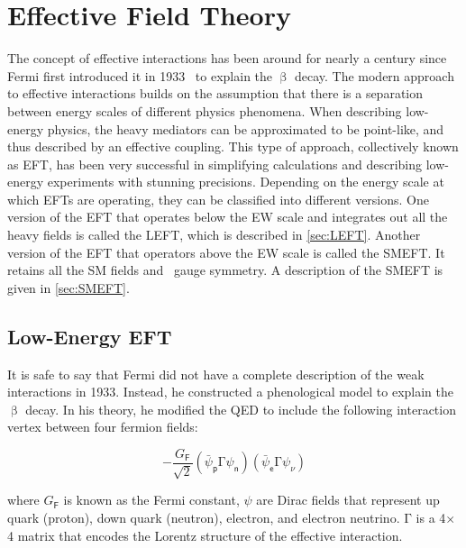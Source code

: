\chapter{Effective Field Theory}
\label{chap:EFT}

The concept of effective interactions has been around for nearly a century since Fermi first introduced it in 1933~\cite{Fermi:1933jpa} to explain the $\upbeta$ decay. The modern approach to effective interactions builds on the assumption that there is a separation between energy scales of different physics phenomena. When describing low-energy physics, the heavy mediators can be approximated to be point-like, and thus described by an effective coupling. This type of approach, collectively known as \ac{EFT}, has been very successful in simplifying calculations and describing low-energy experiments with stunning precisions. Depending on the energy scale at which \acp{EFT} are operating, they can be classified into different versions. One version of the \ac{EFT} that operates below the \ac{EW} scale and integrates out all the heavy fields is called the \ac{LEFT}, which is described in \autoref{sec:LEFT}. Another version of the \ac{EFT} that operators above the \ac{EW} scale is called the \ac{SMEFT}. It retains all the \ac{SM} fields and \sm~gauge symmetry. A description of the \ac{SMEFT} is given in \autoref{sec:SMEFT}.

\section{Low-Energy EFT}
\label{sec:LEFT}

It is safe to say that Fermi did not have a complete description of the weak interactions in 1933. Instead, he constructed a phenological model to explain the $\upbeta$ decay. In his theory, he modified the \ac{QED} to include the following interaction vertex between four fermion fields:

\begin{equation}
-\frac{G_{\textsf{F}}}{\sqrt{2}}(\bar{\psi}_{\textsf{p}}\mathrm{\Gamma}\psi_{\textsf{n}})(\bar{\psi}_{\textsf{e}}\mathrm{\Gamma}\psi_{\nu})
\end{equation}

where $G_{\textsf{F}}$ is known as the Fermi constant, $\psi$ are Dirac fields that represent up quark (proton), down quark (neutron), electron, and electron neutrino. $\mathrm{\Gamma}$ is a 4$\times$4 matrix that encodes the Lorentz structure of the effective interaction. 

